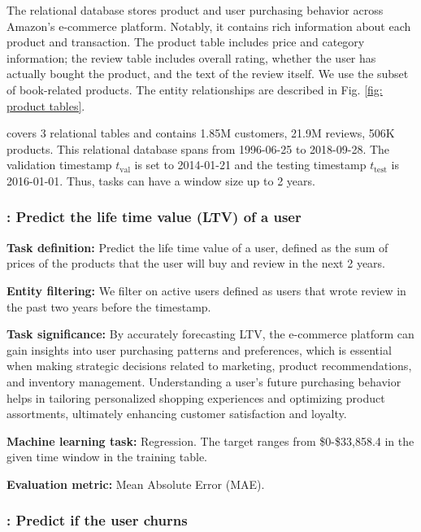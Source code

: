  The \Amazon relational database stores product and user purchasing behavior across Amazon's e-commerce platform. Notably, it contains rich information about each product and transaction. The product table includes price and category information; the review table includes overall rating, whether the user has actually bought the product, and the text of the review itself. We use the subset of book-related products. The entity relationships are described in Fig. \ref{fig: product tables}.

 \Amazon covers 3 relational tables and contains 1.85M customers, 21.9M reviews, 506K products. This relational database spans from 1996-06-25 to 2018-09-28. The validation timestamp $t_{\text{val}}$ is set to 2014-01-21 and the testing timestamp $t_{\text{test}}$ is 2016-01-01. Thus, tasks can have a window size up to 2 years.

\subsubsection{\AmazonLTV: Predict the life time value (LTV) of a user} 



\textbf{Task definition:} Predict the life time value of a user, defined as the sum of prices of the products that the user will buy and review in the next 2 years. 

\textbf{Entity filtering:} We filter on active users defined as users that wrote review in the past two years before the timestamp. 

\textbf{Task significance:} By accurately forecasting LTV, the e-commerce platform can gain insights into user purchasing patterns and preferences, which is essential when making strategic decisions related to marketing, product recommendations, and inventory management. Understanding a user's future purchasing behavior helps in tailoring personalized shopping experiences and optimizing product assortments, ultimately enhancing customer satisfaction and loyalty.

\textbf{Machine learning task:} Regression. The target ranges from \$0-\$33,858.4 in the given time window in the training table.


\textbf{Evaluation metric:} Mean Absolute Error (MAE).

\subsubsection{\AmazonChurn: Predict if the user churns} 

